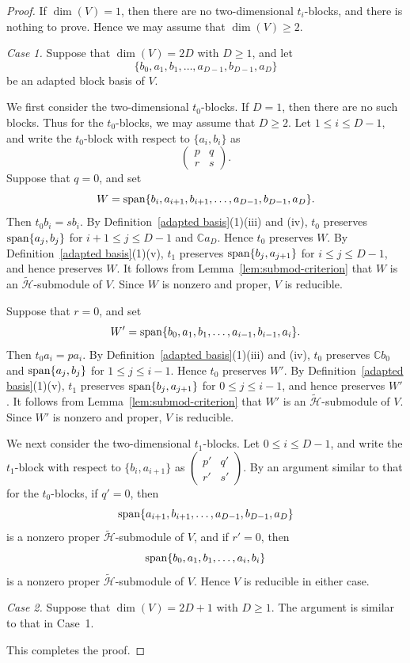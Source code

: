 \documentclass[reqno]{amsart}
\theoremstyle{definition}
\begin{document}
\begin{proof}
%
If $\dim(V)=1$, then there are no two-dimensional $t_i$-blocks, and there
is nothing to prove.
Hence we may assume that $\dim(V)\geq 2$.

\medskip
\noindent
{\it Case 1.}
Suppose that $\dim(V)=2D$ with $D\geq 1$, and let
$$
\{b_0,a_1,b_1,\ldots,a_{D-1},b_{D-1},a_D\}
$$
be an adapted block basis of $V$.

We first consider the two-dimensional $t_0$-blocks.
If $D=1$, then there are no such blocks.
Thus for the $t_0$-blocks, we may assume that $D\geq 2$.
Let $1\leq i\leq D-1$, and write the $t_0$-block with respect to
$\{a_i,b_i\}$ as
$$
\begin{pmatrix}
p&q\\
r&s
\end{pmatrix}.
$$
Suppose that $q=0$, and set
$$
W={\rm span}\{b_i,a_{i+1},b_{i+1},\ldots,
a_{D-1},b_{D-1},a_D\}.
$$
Then $t_0b_i=sb_i$.
By Definition~\ref{adapted basis}(1)(iii) and (iv), $t_0$ preserves
${\rm span}\{a_j,b_j\}$ for $i+1\leq j\leq D-1$ and
$\mathbb Ca_D$.
Hence $t_0$ preserves $W$.
By Definition~\ref{adapted basis}(1)(v), $t_1$ preserves
${\rm span}\{b_j,a_{j+1}\}$ for $i\leq j\leq D-1$, and hence
preserves $W$.
It follows from Lemma~\ref{lem:submod-criterion} that $W$ is an
$\widetilde{\mathcal H}$-submodule of $V$.
Since $W$ is nonzero and proper, $V$ is reducible.

\noindent
Suppose that $r=0$, and set
$$
W'={\rm span}\{b_0,a_1,b_1,\ldots,
a_{i-1},b_{i-1},a_i\}.
$$
Then $t_0a_i=pa_i$.
By Definition~\ref{adapted basis}(1)(iii) and (iv), $t_0$ preserves
$\mathbb Cb_0$ and
${\rm span}\{a_j,b_j\}$ for $1\leq j\leq i-1$.
Hence $t_0$ preserves $W'$.
By Definition~\ref{adapted basis}(1)(v), $t_1$ preserves
${\rm span}\{b_j,a_{j+1}\}$ for $0\leq j\leq i-1$, and hence
preserves $W'$.
It follows from Lemma~\ref{lem:submod-criterion} that $W'$ is an
$\widetilde{\mathcal H}$-submodule of $V$.
Since $W'$ is nonzero and proper, $V$ is reducible.

We next consider the two-dimensional $t_1$-blocks.
Let $0\leq i\leq D-1$, and write the $t_1$-block with respect to
$\{b_i,a_{i+1}\}$ as
$
\begin{pmatrix}
p' & q'\\
r' & s'
\end{pmatrix}.
$
By an argument similar to that for the $t_0$-blocks, if $q'=0$, then
$$
{\rm span}\{a_{i+1},b_{i+1},\ldots,
a_{D-1},b_{D-1},a_D\}
$$
is a nonzero proper $\widetilde{\mathcal H}$-submodule of $V$, and if
$r'=0$, then
$$
{\rm span}\{b_0,a_1,b_1,\ldots,a_i,b_i\}
$$
is a nonzero proper $\widetilde{\mathcal H}$-submodule of $V$.
Hence $V$ is reducible in either case.

\medskip
\noindent
{\it Case 2.}
Suppose that $\dim(V)=2D+1$ with $D\geq 1$.
The argument is similar to that in Case~1.

This completes the proof.
\end{proof}
\end{document}
